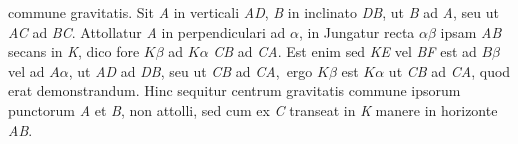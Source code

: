 commune gravitatis.
Sit \textit{A} in verticali \textit{AD}, \textit{B} in inclinato \textit{DB}, 
ut \textit{B} ad \textit{A}, seu ut \textit{AC} ad \textit{BC}. 
\pend 
\pstart 
Attollatur \textit{A} in perpendiculari 
ad $\alpha$, 
in 
Jungatur recta $\alpha\beta$ ipsam \textit{AB} secans in \textit{K}, dico fore $K\beta$ ad $K\alpha$ 
\textit{CB} ad \textit{CA}. Est enim 
sed \textit{KE} vel \textit{BF} est ad $B\beta$ vel ad $A\alpha$, 
ut \textit{AD} ad \textit{DB}, seu ut \textit{CB} ad \textit{CA}\lbrack,\rbrack\ ergo $K\beta$ est 
$K\alpha$ ut \textit{CB} ad \textit{CA}, quod erat demonstrandum. 
\pend 
\pstart 
Hinc sequitur centrum gravitatis commune ipsorum punctorum \textit{A} et \textit{B}, 
non attolli, sed cum ex \textit{C} transeat in \textit{K} manere in horizonte \textit{AB}. 
\pend 



